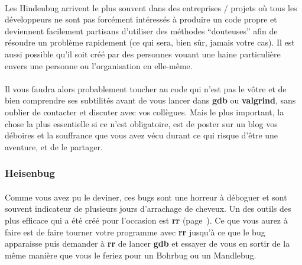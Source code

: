 \paragraph{} Les Hindenbug arrivent le plus souvent dans des entreprises /
projets où tous les développeurs ne sont pas forcément intéressés à produire un
code propre et deviennent facilement partisans d'utiliser des méthodes
``douteuses'' afin de résoudre un problème rapidement (ce qui sera, bien sûr,
jamais votre cas). Il est aussi possible qu'il soit créé par des personnes
vouant une haine particulière envers une personne ou l'organisation en
elle-même.

\paragraph{} Il vous faudra alors probablement toucher au code qui n'est pas le
vôtre et de bien comprendre ses subtilités avant de vous lancer dans
\textbf{gdb} ou \textbf{valgrind}, sans oublier de contacter et discuter avec
vos collègues.  Mais le plus important, la chose la plus essentielle si ce
n'est obligatoire, est de poster sur un blog vos déboires et la souffrance que
vous avez vécu durant ce qui risque d'être une aventure, et de le partager.


\subsubsection{Heisenbug}

\paragraph{} Comme vous avez pu le deviner, ces bugs sont une horreur à
déboguer et sont souvent indicateur de plusieurs jours d'arrachage de cheveux.
Un des outils des plus efficace qui a été créé pour l'occasion est \textbf{rr}
(page~\pageref{part:rr}). Ce que vous aurez à faire est de faire tourner votre
programme avec \textbf{rr} jusqu'à ce que le bug apparaisse puis demander à
\textbf{rr} de lancer \textbf{gdb} et essayer de vous en sortir de la même
manière que vous le feriez pour un Bohrbug ou un Mandlebug.
